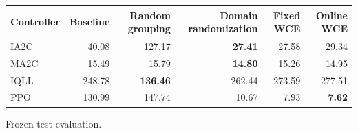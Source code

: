 \begin{tabular}{lrrrrr}
\hline
Controller & Baseline & Random grouping & Domain randomization & Fixed WCE & Online WCE \\
\hline
IA2C & 40.08 & 127.17 & \textbf{27.41} & 27.58 & 29.34 \\
MA2C & 15.49 & 15.79 & \textbf{14.80} & 15.26 & 14.95 \\
IQLL & 248.78 & \textbf{136.46} & 262.44 & 273.59 & 277.51 \\
PPO & 130.99 & 147.74 & 10.67 & 7.93 & \textbf{7.62} \\
\hline
\end{tabular}
Frozen test evaluation.
